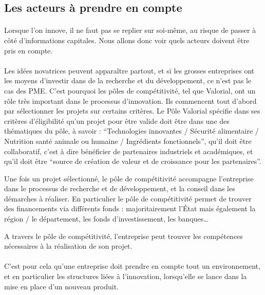 \documentclass[a4paper,12pt]{report}
\begin{document}
		\subsection{Les acteurs à prendre en compte}
			\paragraph{}Lorsque l'on innove, il ne faut pas se replier sur soi-même, au risque de passer à côté d'informations capitales. Nous allons donc voir quels acteurs doivent être pris en compte.			
			
			\paragraph{}Les idées novatrices peuvent apparaître partout, et si les grosses entreprises ont les moyens d’investir dans de la recherche et du développement, ce n’est pas le cas des PME. C’est pourquoi les pôles de compétitivité, tel que Valorial, ont un rôle très important dans le processus d’innovation. Ils commencent tout d’abord par sélectionner les projets sur certains critères. Le Pôle Valorial spécifie dans ses critères d’éligibilité\cite{Eligibilite} qu’un projet pour être valide doit être dans une des thématiques du pôle, à savoir : “Technologies innovantes / Sécurité alimentaire / Nutrition santé animale ou humaine / Ingrédients fonctionnels”, qu’il doit être collaboratif, c’est à dire bénéficier de partenaires industriels et académiques, et qu’il doit être “source de création de valeur et de croissance pour les partenaires”.
			
			Une fois un projet sélectionné, le pôle de compétitivité accompagne l’entreprise dans le processus de recherche et de développement, et la conseil dans les démarches à réaliser. En particulier le pôle de compétitivité permet de trouver des financements via différents fonds : majoritairement l’État mais également la région / le département, les fonds d’investissement, les banques…
			
			A travers le pôle de compétitivité, l’entreprise peut trouver les compétences nécessaires à la réalisation de son projet.
			
		\paragraph{}C'est pour cela qu'une entreprise doit prendre en compte tout un environnement, et en particulier les structures liées à l'innovation, lorsqu'elle se lance dans la mise en place d'un nouveau produit.
				
\end{document}
